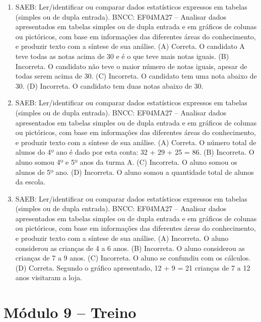 \begin{enumerate}
\item
SAEB: Ler/identificar ou comparar dados estatísticos expressos em tabelas (simples ou de dupla entrada).
BNCC: EF04MA27 -- Analisar dados apresentados em tabelas simples ou de dupla entrada e em gráficos de
colunas ou pictóricos, com base em informações das diferentes áreas do conhecimento, e produzir
texto com a síntese de sua análise.
(A) Correta. O candidato A teve todas as notas acima de 30 e é o que teve mais notas iguais.
(B) Incorreta. O candidato não teve o maior número de notas iguais, apesar de todas serem acima de 30.
(C) Incorreta. O candidato tem uma nota abaixo de 30.
(D) Incorreta. O candidato tem duas notas abaixo de 30.

\item
SAEB: Ler/identificar ou comparar dados estatísticos expressos em tabelas (simples ou de dupla entrada).
BNCC: EF04MA27 -- Analisar dados apresentados em tabelas simples ou de dupla entrada e em gráficos de
colunas ou pictóricos, com base em informações das diferentes áreas do conhecimento, e produzir
texto com a síntese de sua análise.
(A)  Correta. O número total de alunos do 4º ano é dado por esta conta: 32 + 29 + 25 = 86.
(B)  Incorreta. O aluno somou 4º e 5º anos da turma A.
(C)  Incorreta. O aluno somou os alunos de 5º ano.
(D)  Incorreta. O aluno somou a quantidade total de alunos da escola.

\item
SAEB: Ler/identificar ou comparar dados estatísticos expressos em tabelas (simples ou de dupla entrada).
BNCC: EF04MA27 -- Analisar dados apresentados em tabelas simples ou de dupla entrada e em gráficos de
colunas ou pictóricos, com base em informações das diferentes áreas do conhecimento, e produzir
texto com a síntese de sua análise.
(A)  Incorreta. O aluno considerou as crianças de 4 a 6 anos.
(B)  Incorreta. O aluno considerou as crianças de 7 a 9 anos.
(C)  Incorreta. O aluno se confundiu com os cálculos.
(D)  Correta. Segundo o gráfico apresentado, 12 + 9 = 21 crianças de 7 a 12 anos visitaram a loja.
\end{enumerate}

\section*{Módulo 9 – Treino}

